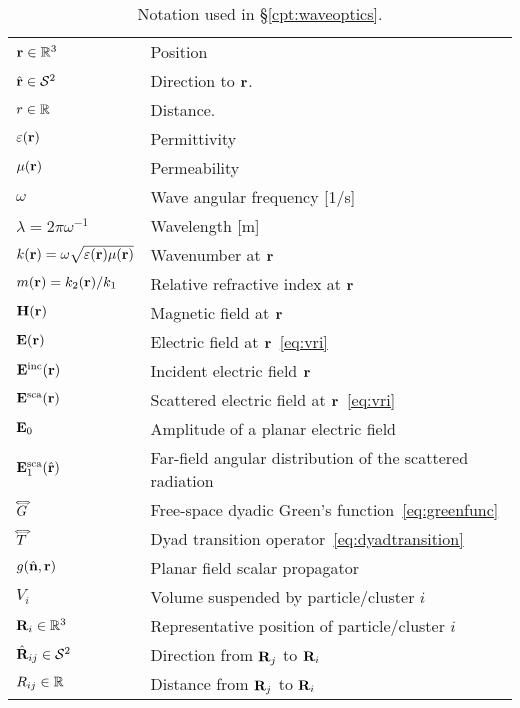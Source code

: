 \begin{table}[h!]
	\centering
    \caption[Notation used in \S\ref{cpt:waveoptics}]{\label{tab:waveoptics:notation}
    	Notation used in \S\ref{cpt:waveoptics}.
    }
	\renewcommand{\arraystretch}{1.2}
    \begin{tabular}{ll}
        $\mathbf{r}\in\mathbb{R}^3$ & Position \\
        $\hat{\mathbf{r}}\in\mathcal{S}^2$ & Direction to $\mathbf{r}$. \\
        $r\in\mathbb{R}$ & Distance. \\
        \hline
        $\varepsilon(\mathbf{r})$ & Permittivity \\
        $\mu(\mathbf{r})$ & Permeability \\
        $\omega$ & Wave angular frequency [1/s] \\
        $\lambda=2\pi\omega^{-1}$ & Wavelength [m] \\
        $k(\mathbf{r})=\omega\sqrt{\varepsilon(\mathbf{r})\mu(\mathbf{r})}$ & Wavenumber at $\mathbf{r}$\\
        $m(\mathbf{r})=k_2(\mathbf{r})/k_1$ & Relative refractive index at $\mathbf{r}$ \\
        \hline
        $\mathbf{H}(\mathbf{r})$ & Magnetic field at $\mathbf{r}$ \\
        $\mathbf{E}(\mathbf{r})$   & Electric field at $\mathbf{r}$~\eqref{eq:vri}  \\
        $\mathbf{E}^\mathrm{inc}(\mathbf{r})$ & Incident electric field $\mathbf{r}$\\
        $\mathbf{E}^\mathrm{sca}(\mathbf{r})$ & Scattered electric field at $\mathbf{r}$~\eqref{eq:vri}\\ 
        $\mathbf{E}_0$ & Amplitude of a planar electric field \\
        $\mathbf{E}^\mathrm{sca}_1(\hat{\mathbf{r}})$ & Far-field angular distribution of the scattered radiation  \\
        \hline
        ${\accentset{\Longleftrightarrow}{G}}$ & Free-space dyadic Green's function~\eqref{eq:greenfunc} \\
        ${\accentset{\Longleftrightarrow}{T}}$ & Dyad transition operator~\eqref{eq:dyadtransition}\\
        $g(\hat{\mathbf{n}},\mathbf{r})$ & Planar field scalar propagator \\
        \hline
        \hline
        $V_i$ & Volume suspended by particle/cluster $i$ \\
        $\mathbf{R}_i\in\mathbb{R}^3$ & Representative position of particle/cluster $i$ \\
        $\hat{\mathbf{R}}_{ij}\in\mathcal{S}^2$ & Direction from $\mathbf{R}_j$ to $\mathbf{R}_i$\\
        $R_{ij}\in\mathbb{R}$ & Distance from $\mathbf{R}_j$ to $\mathbf{R}_i$\\

\end{tabular}
\end{table}
